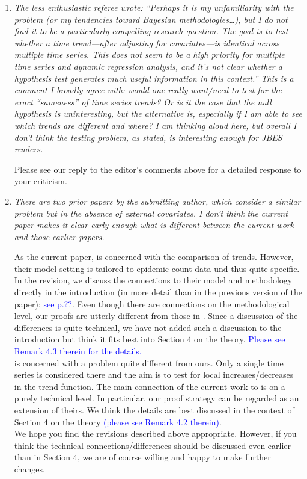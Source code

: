 \documentclass[a4paper,12pt]{article}
\begin{document}
\begin{enumerate}[label=\arabic*.,leftmargin=0.6cm]


\item \textit{The less enthusiastic referee wrote: “Perhaps it is my unfamiliarity with the problem (or my tendencies toward Bayesian methodologies…), but I do not find it to be a particularly compelling research question. The goal is to test whether a time trend—after adjusting for covariates—is identical across multiple time series. This does not seem to be a high priority for multiple time series and dynamic regression analysis, and it’s not clear whether a hypothesis test generates much useful information in this context.” This is a comment I broadly agree with: would one really want/need to test for the exact “sameness” of time series trends? Or is it the case that the null hypothesis is uninteresting, but the alternative is, especially if I am able to see which trends are different and where? I am thinking aloud here, but overall I don’t think the testing problem, as stated, is interesting enough for JBES readers.}

Please see our reply to the editor's comments above for a detailed response to your criticism. 
  

\item \textit{There are two prior papers by the submitting author, which consider a similar problem but in the absence of external covariates. I don’t think the current paper makes it clear early enough what is different between the current work and those earlier papers.}  

As the current paper, \cite{KhismatullinaVogt2021} is concerned with the comparison of trends. However, their model setting is tailored to epidemic count data und thus quite specific. In the revision, we discuss the connections to their model and methodology directly in the introduction (in more detail than in the previous version of the paper); \textcolor{blue}{see p.??}. Even though there are connections on the methodological level, our proofs are utterly different from those in \cite{KhismatullinaVogt2021}. Since a discussion of the differences is quite technical, we have not added such a discussion to the introduction but think it fits best into Section 4 on the theory. \textcolor{blue}{Please see Remark 4.3 therein for the details.} \\
\cite{KhismatullinaVogt2020} is concerned with a problem quite different from ours. Only a single time series is considered there and the aim is to test for local increases/decreases in the trend function. The main connection of the current work to \cite{KhismatullinaVogt2020} is on a purely technical level. In particular, our proof strategy can be regarded as an extension of theirs. We think the details are best discussed in the context of Section 4 on the theory \textcolor{blue}{(please see Remark 4.2 therein)}. \\
We hope you find the revisions described above appropriate. However, if you think the technical connections/differences should be discussed even earlier than in Section 4, we are of course willing and happy to make  further changes.  



\end{enumerate}
\end{document}
